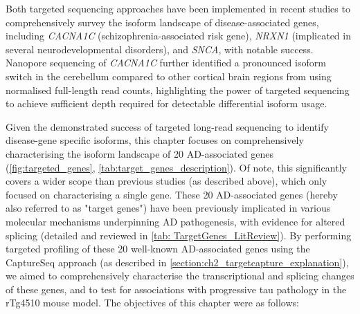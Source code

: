 Both targeted sequencing approaches have been implemented in recent studies\cite{Clark2019,Treutlein2014,Tseng2019} to comprehensively survey the isoform landscape of disease-associated genes, including \textit{CACNA1C} (schizophrenia-associated risk gene)\cite{Clark2019}, \textit{NRXN1}\cite{Treutlein2014} (implicated in several neurodevelopmental disorders), and \textit{SNCA}\cite{Tseng2019}, with notable success. Nanopore sequencing of \textit{CACNA1C} further identified a pronounced isoform switch in the cerebellum compared to other cortical brain regions from using normalised full-length read counts\cite{Clark2019}, highlighting the power of targeted sequencing to achieve sufficient depth required for detectable differential isoform usage. 

Given the demonstrated success of targeted long-read sequencing to identify disease-gene specific isoforms, this chapter focuses on comprehensively characterising the isoform landscape of 20 AD-associated genes (\cref{fig:targeted_genes}, \cref{tab:target_genes_description}). Of note, this significantly covers a wider scope than previous studies (as described above), which only focused on characterising a single gene. These 20 AD-associated genes (hereby also referred to as "target genes") have been previously implicated in various molecular mechanisms underpinning AD pathogenesis, with evidence for altered splicing (detailed and reviewed in \cref{tab: TargetGenes_LitReview}). By performing targeted profiling of these 20 well-known AD-associated genes using the CaptureSeq approach (as described in \cref{section:ch2_targetcapture_explanation}), we aimed to comprehensively characterise the transcriptional and splicing changes of these genes, and to test for associations with progressive tau pathology in the rTg4510 mouse model. The objectives of this chapter were as follows:
